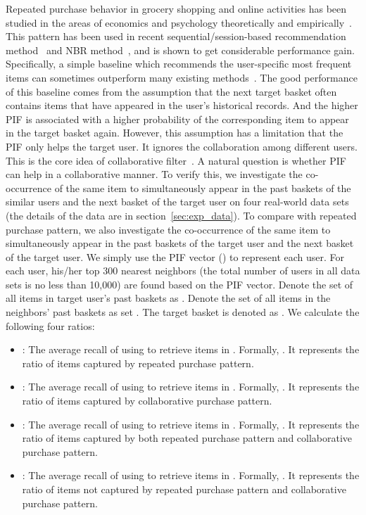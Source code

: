 \documentclass[sigconf]{acmart}
\begin{document}
Repeated purchase behavior
in grocery shopping and online activities has been studied in the areas of economics and psychology theoretically and empirically~\cite{anderson2014dynamics}\cite{benson2016modeling}\cite{dawes2015has}\cite{jacoby1973brand}.  This pattern has been used in recent sequential/session-based recommendation method~\cite{ren2019repeatnet}\cite{wang2019modeling} and NBR method~\cite{hu2019sets2sets}\cite{wan2018representing}, and is shown to get  considerable performance gain.  Specifically, a simple baseline which recommends the  user-specific most  frequent items can sometimes outperform many existing  methods~\cite{hu2019sets2sets}.  The good performance of this baseline comes from the assumption that the next  target basket often  contains items that have appeared in the user's historical records. And the  higher PIF is associated with a higher probability of the corresponding item  to  appear in the target basket again.  However, this assumption has a limitation that the PIF only helps the target  user. It ignores the collaboration among different users. This is  the core idea of  collaborative filter~\cite{konstan1997grouplens}. A natural question is whether PIF can help in  a collaborative manner. To  verify this, we investigate the co-occurrence of the same item to simultaneously appear in the past baskets of the similar users and  the next basket of the  target user on four  real-world data sets (the details of the data are in  section~\ref{sec:exp_data}).  To compare with repeated purchase pattern,  we also investigate the  co-occurrence of the same item to simultaneously  appear in the past baskets of the target user and the  next basket of the target user. We simply use the PIF vector () to represent each user. For each user, his/her top 300 nearest neighbors (the total number of users in all data sets is no less than 10,000) are found based on the PIF vector. Denote the set of all items in target user's past baskets as . Denote the set of all items in the neighbors' past baskets as set . The target basket is denoted as .  We calculate the  following four ratios: 
\begin{itemize}

    \item{:} The  average recall of using   to retrieve items in .  Formally, . It represents the  ratio of items captured by  repeated purchase pattern.
    \item{:} The  average recall of using   to retrieve items in .  Formally, . It represents the ratio of items captured by collaborative purchase pattern.
    \item{:} The  average recall of using   to retrieve items in .  Formally, . It represents the ratio of items captured by both repeated purchase pattern and collaborative purchase pattern.
    \item{:} The  average recall of using  to retrieve items in .  Formally, . It represents the  ratio of items not captured by  repeated purchase pattern and collaborative purchase pattern. 

    
\end{itemize}
   
\end{document}

